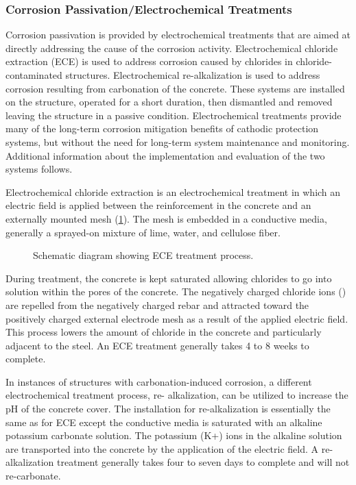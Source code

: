 \subsubsection{Corrosion Passivation/Electrochemical Treatments}
Corrosion passivation is provided by electrochemical treatments that are aimed at directly addressing the cause of the corrosion activity. Electrochemical chloride extraction (ECE) is used to address corrosion caused by chlorides in chloride-contaminated structures.  Electrochemical re-alkalization is used to address corrosion resulting from carbonation of the concrete. These systems are installed on the structure, operated for a short duration, then dismantled and removed leaving the structure in a passive condition. Electrochemical treatments provide many of the long-term corrosion mitigation benefits of cathodic protection systems, but without the need for long-term system maintenance and monitoring. Additional information about the implementation and evaluation of the two systems follows.

Electrochemical chloride extraction is an electrochemical treatment in which an electric field is applied between the reinforcement in the concrete and an externally mounted mesh (\cref{fig:schematic-diagram-ece-treatment}). The mesh is embedded in a conductive media, generally a sprayed-on mixture of lime, water, and cellulose fiber.

\begin{figure}
  \caption{Schematic diagram showing ECE treatment process.}
  \label{fig:schematic-diagram-ece-treatment}
\end{figure}

During treatment, the concrete is kept saturated allowing chlorides to go into solution within the pores of the concrete. The negatively charged chloride ions () are repelled from the negatively charged rebar and attracted toward the positively charged external electrode mesh as a result of the applied electric field. This process lowers the amount of chloride in the concrete and particularly adjacent to the steel. An ECE treatment generally takes 4 to 8 weeks to complete.

In instances of structures with carbonation-induced corrosion, a different electrochemical treatment process, re- alkalization, can be utilized to increase the pH of the concrete cover. The installation for re-alkalization is essentially the same as for ECE except the conductive media is saturated with an alkaline potassium carbonate solution. The potassium (K+) ions in the alkaline solution are transported into the concrete by the application of the electric field.  A re-alkalization treatment generally takes four to seven days to complete and will not re-carbonate.

